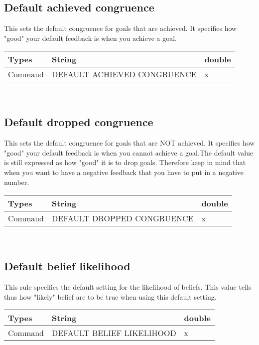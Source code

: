\documentclass{scrartcl}
\begin{document}
\subsection{Default achieved congruence}
This sets the default congruence for goals that are achieved. It specifies how "good" your default feedback is when you achieve a goal.\\
\begin{tabular}{|l|l|l|}
	\hline  Types & String & double  \\ 
	\hline  Command & DEFAULT ACHIEVED CONGRUENCE & x  \\ 
	\hline 
\end{tabular}
\\

\subsection{Default dropped congruence}
This sets the default congruence for goals that are NOT achieved. It specifies how "good" your default feedback is when you cannot achieve a goal.The default value is still expressed as how "good" it is to drop goals. Therefore keep in mind that when you want to have a negative feedback that you have to put in a negative number.\\
\begin{tabular}{|l|l|l|}
	\hline  Types & String & double  \\ 
	\hline  Command & DEFAULT DROPPED CONGRUENCE & x  \\ 
	\hline 
\end{tabular}
\\

\subsection{Default belief likelihood}
This rule specifies the default setting for the likelihood of beliefs. This value tells thus how "likely" belief are to be true when using this default setting.\\
\begin{tabular}{|l|l|l|}
	\hline  Types & String & double  \\ 
	\hline  Command & DEFAULT BELIEF LIKELIHOOD & x  \\ 
	\hline 
\end{tabular}
\\
\end{document}
